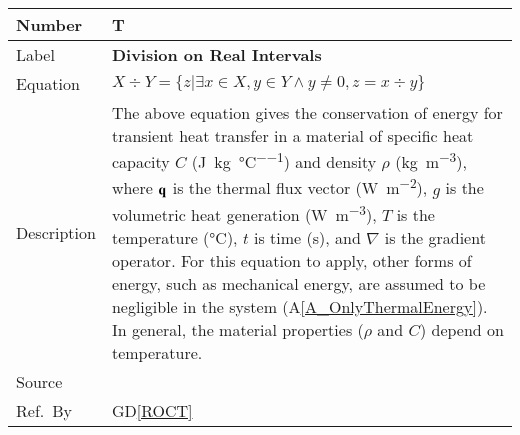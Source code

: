 \documentclass[12pt]{article}
\newcommand{\colAwidth}{0.13\textwidth}
\newcommand{\colBwidth}{0.82\textwidth}
\newcommand{\dref}[1]{GD\ref{#1}}
\newcounter{theorynum} %
\newcommand{\aref}[1]{A\ref{#1}}
\begin{document}
\noindent
\begin{minipage}{\textwidth}
	\renewcommand*{\arraystretch}{1.5}
	\begin{tabular}{| p{\colAwidth} | p{\colBwidth}|}
		\hline
		\rowcolor[gray]{0.9}
		Number& T{theorynum}\thetheorynum 
		\label{T_division}\\
		\hline
		Label&\bf Division on Real Intervals\\
		\hline
		Equation&  $X \div Y = \{z | \exists x \in X, y \in Y \wedge y \neq 0, 
		z 
		= x \div y\}$\\
		\hline
		Description & 
		The above equation gives the conservation of energy for transient heat 
		transfer in a material
		of specific heat capacity $C$ (\si{\joule\per\kilogram\per\celsius}) 
		and density $\rho$ 
		(\si{\kilogram\per\cubic\metre}), where $\bf q$ is the thermal flux 
		vector (\si{\watt\per\square\metre}),
		$g$ is the volumetric heat generation
		(\si{\watt\per\cubic\metre}), $T$ is the temperature
		(\si{\celsius}),  $t$ is time (\si{\second}), and $\nabla$ is
		the gradient operator.  For this equation to apply, other forms
		of energy, such as mechanical energy, are assumed to be negligible in 
		the
		system (\aref{A_OnlyThermalEnergy}).  In general, the material 
		properties ($\rho$ and $C$) depend on temperature.\\
		\hline
		Source & \citet{intervalarithmetic}\\
		\hline
		Ref.\ By & \dref{ROCT}\\
		\hline
	\end{tabular}
\end{minipage}\\

~\newline
\end{document}

